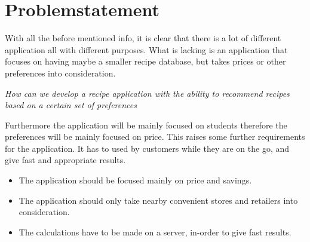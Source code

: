 \section{Problemstatement}
\label{sec:probstate}

With all the before mentioned info, it is clear that there is a lot of different application all with different purposes. What is lacking is an application that focuses on having maybe a smaller recipe database, but takes prices or other preferences into consideration.

\emph{How can we develop a recipe application with the ability to recommend recipes based on a certain set of preferences}

Furthermore the application will be mainly focused on students therefore the preferences will be mainly focused on price. This raises some further requirements for the application. It has to used by customers while they are on the go, and give fast and appropriate results.

\begin{itemize}
\item The application should be focused mainly on price and savings.
\item The application should only take nearby convenient stores and retailers into consideration.
\item The calculations have to be made on a server, in-order to give fast results.
\end{itemize}



